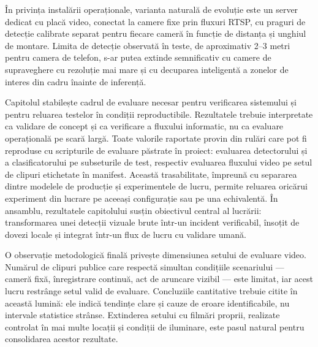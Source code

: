 În privința instalării operaționale, varianta naturală de evoluție este un server dedicat cu placă video, conectat la camere fixe prin fluxuri RTSP, cu praguri de detecție calibrate separat pentru fiecare cameră în funcție de distanța și unghiul de montare. Limita de detecție observată în teste, de aproximativ 2--3 metri pentru camera de telefon, s-ar putea extinde semnificativ cu camere de supraveghere cu rezoluție mai mare și cu decuparea inteligentă a zonelor de interes din cadru înainte de inferență.

Capitolul stabilește cadrul de evaluare necesar pentru verificarea sistemului și pentru reluarea testelor în condiții reproductibile. Rezultatele trebuie interpretate ca validare de concept și ca verificare a fluxului informatic, nu ca evaluare operațională pe scară largă. Toate valorile raportate provin din rulări care pot fi reproduse cu scripturile de evaluare păstrate în proiect: evaluarea detectorului și a clasificatorului pe subseturile de test, respectiv evaluarea fluxului video pe setul de clipuri etichetate în manifest. Această trasabilitate, împreună cu separarea dintre modelele de producție și experimentele de lucru, permite reluarea oricărui experiment din lucrare pe aceeași configurație sau pe una echivalentă. În ansamblu, rezultatele capitolului susțin obiectivul central al lucrării: transformarea unei detecții vizuale brute într-un incident verificabil, însoțit de dovezi locale și integrat într-un flux de lucru cu validare umană.

O observație metodologică finală privește dimensiunea setului de evaluare video. Numărul de clipuri publice care respectă simultan condițiile scenariului --- cameră fixă, înregistrare continuă, act de aruncare vizibil --- este limitat, iar acest lucru restrânge setul valid de evaluare. Concluziile cantitative trebuie citite în această lumină: ele indică tendințe clare și cauze de eroare identificabile, nu intervale statistice strânse. Extinderea setului cu filmări proprii, realizate controlat în mai multe locații și condiții de iluminare, este pasul natural pentru consolidarea acestor rezultate.
